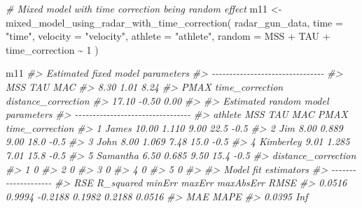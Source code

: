 \documentclass[fleqn,10pt,lineno]{wlpeerj} %
\newenvironment{Shaded}{\begin{snugshade}}{\end{snugshade}}
\newcommand{\AttributeTok}[1]{\textcolor[rgb]{0.77,0.63,0.00}{#1}}
\newcommand{\CommentTok}[1]{\textcolor[rgb]{0.56,0.35,0.01}{\textit{#1}}}
\newcommand{\DecValTok}[1]{\textcolor[rgb]{0.00,0.00,0.81}{#1}}
\newcommand{\FunctionTok}[1]{\textcolor[rgb]{0.00,0.00,0.00}{#1}}
\newcommand{\NormalTok}[1]{#1}
\newcommand{\OtherTok}[1]{\textcolor[rgb]{0.56,0.35,0.01}{#1}}
\newcommand{\SpecialCharTok}[1]{\textcolor[rgb]{0.00,0.00,0.00}{#1}}
\newcommand{\StringTok}[1]{\textcolor[rgb]{0.31,0.60,0.02}{#1}}
\begin{document}
\begin{Shaded}
\begin{Highlighting}[]
\CommentTok{\# Mixed model with time correction being random effect}
\NormalTok{m11 }\OtherTok{\textless{}{-}} \FunctionTok{mixed\_model\_using\_radar\_with\_time\_correction}\NormalTok{(}
\NormalTok{  radar\_gun\_data,}
  \AttributeTok{time =} \StringTok{"time"}\NormalTok{,}
  \AttributeTok{velocity =} \StringTok{"velocity"}\NormalTok{,}
  \AttributeTok{athlete =} \StringTok{"athlete"}\NormalTok{,}
  \AttributeTok{random =}\NormalTok{ MSS }\SpecialCharTok{+}\NormalTok{ TAU }\SpecialCharTok{+}\NormalTok{ time\_correction }\SpecialCharTok{\textasciitilde{}} \DecValTok{1}
\NormalTok{)}

\NormalTok{m11}
\CommentTok{\#\textgreater{} Estimated fixed model parameters}
\CommentTok{\#\textgreater{} {-}{-}{-}{-}{-}{-}{-}{-}{-}{-}{-}{-}{-}{-}{-}{-}{-}{-}{-}{-}{-}{-}{-}{-}{-}{-}{-}{-}{-}{-}{-}{-}}
\CommentTok{\#\textgreater{}                 MSS                 TAU                 MAC }
\CommentTok{\#\textgreater{}                8.30                1.01                8.24 }
\CommentTok{\#\textgreater{}                PMAX     time\_correction distance\_correction }
\CommentTok{\#\textgreater{}               17.10               {-}0.50                0.00 }
\CommentTok{\#\textgreater{} }
\CommentTok{\#\textgreater{} Estimated random model parameters}
\CommentTok{\#\textgreater{} {-}{-}{-}{-}{-}{-}{-}{-}{-}{-}{-}{-}{-}{-}{-}{-}{-}{-}{-}{-}{-}{-}{-}{-}{-}{-}{-}{-}{-}{-}{-}{-}{-}}
\CommentTok{\#\textgreater{}     athlete   MSS   TAU  MAC PMAX time\_correction}
\CommentTok{\#\textgreater{} 1     James 10.00 1.110 9.00 22.5            {-}0.5}
\CommentTok{\#\textgreater{} 2       Jim  8.00 0.889 9.00 18.0            {-}0.5}
\CommentTok{\#\textgreater{} 3      John  8.00 1.069 7.48 15.0            {-}0.5}
\CommentTok{\#\textgreater{} 4 Kimberley  9.01 1.285 7.01 15.8            {-}0.5}
\CommentTok{\#\textgreater{} 5  Samantha  6.50 0.685 9.50 15.4            {-}0.5}
\CommentTok{\#\textgreater{}   distance\_correction}
\CommentTok{\#\textgreater{} 1                   0}
\CommentTok{\#\textgreater{} 2                   0}
\CommentTok{\#\textgreater{} 3                   0}
\CommentTok{\#\textgreater{} 4                   0}
\CommentTok{\#\textgreater{} 5                   0}
\CommentTok{\#\textgreater{} }
\CommentTok{\#\textgreater{} Model fit estimators}
\CommentTok{\#\textgreater{} {-}{-}{-}{-}{-}{-}{-}{-}{-}{-}{-}{-}{-}{-}{-}{-}{-}{-}{-}{-}}
\CommentTok{\#\textgreater{}       RSE R\_squared    minErr    maxErr maxAbsErr      RMSE }
\CommentTok{\#\textgreater{}    0.0516    0.9994   {-}0.2188    0.1982    0.2188    0.0516 }
\CommentTok{\#\textgreater{}       MAE      MAPE }
\CommentTok{\#\textgreater{}    0.0395       Inf}
\end{Highlighting}
\end{Shaded}
\end{document}
